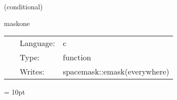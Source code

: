 \documentclass{article}
\begin{document}
\vspace{5mm}

   (conditional) 

\hspace{5mm} maskone 

\hspace{5mm}{\it set mask to one } 


\hspace{5mm}

 \begin{tabular*}{160mm}{cll} 
~ & Language:  & c \\ 
~ & Type:  & function \\ 
~ & Writes:  & spacemask::emask(everywhere) \\ 
\end{tabular*} 



\vspace{5mm}\parskip = 10pt 
\end{document}
